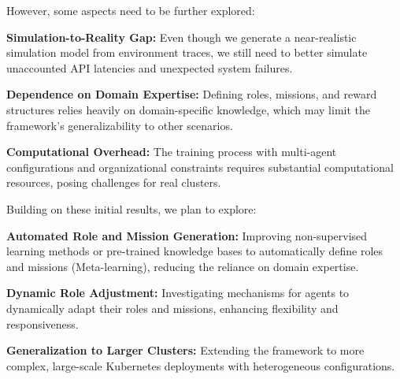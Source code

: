 \documentclass[conference]{IEEEtran}
\begin{document}
However, some aspects need to be further explored:
\begin{enumerate*}[label=\textbf{\arabic*)}, itemjoin={;\quad }]
    \item \textbf{Simulation-to-Reality Gap:} Even though we generate a near-realistic simulation model from environment traces, we still need to better simulate unaccounted API latencies and unexpected system failures.
    \item \textbf{Dependence on Domain Expertise:} Defining roles, missions, and reward structures relies heavily on domain-specific knowledge, which may limit the framework's generalizability to other scenarios.
    \item \textbf{Computational Overhead:} The training process with multi-agent configurations and organizational constraints requires substantial computational resources, posing challenges for real clusters.
\end{enumerate*}

Building on these initial results, we plan to explore:
\begin{enumerate*}[label=\textbf{\arabic*)}, itemjoin={;\quad }]
    \item \textbf{Automated Role and Mission Generation:} Improving non-supervised learning methods or pre-trained knowledge bases to automatically define roles and missions (Meta-learning), reducing the reliance on domain expertise.
    \item \textbf{Dynamic Role Adjustment:} Investigating mechanisms for agents to dynamically adapt their roles and missions, enhancing flexibility and responsiveness.
    \item \textbf{Generalization to Larger Clusters:} Extending the framework to more complex, large-scale Kubernetes deployments with heterogeneous configurations.
\end{enumerate*}
\end{document}
